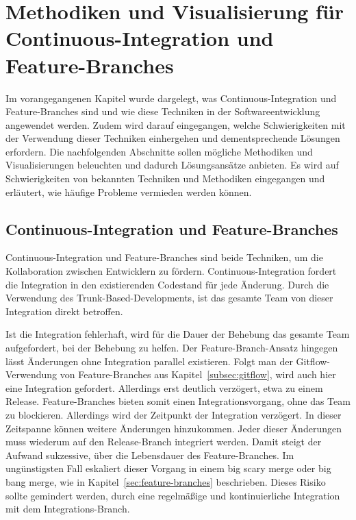 \chapter[Methodiken und Visualisierung]{Methodiken und Visualisierung für Continuous-Integration und Feature-Branches}
\label{ch:visu_meth}

Im vorangegangenen Kapitel wurde dargelegt, was Continuous-Integration und Feature-Branches sind und wie diese Techniken in der Softwareentwicklung angewendet werden. Zudem wird darauf eingegangen, welche Schwierigkeiten mit der Verwendung dieser Techniken einhergehen und dementsprechende Lösungen erfordern. 
Die nachfolgenden Abschnitte sollen mögliche Methodiken und Visualisierungen beleuchten und dadurch Lösungsansätze anbieten. Es wird auf Schwierigkeiten von bekannten Techniken und Methodiken eingegangen und erläutert, wie häufige Probleme vermieden werden können.

\section{Continuous-Integration und Feature-Branches}

Continuous-Integration und Feature-Branches sind beide Techniken, um die Kollaboration zwischen Entwicklern zu fördern. Continuous-Integration fordert die Integration in den existierenden Codestand für jede Änderung. Durch die Verwendung des Trunk-Based-Developments, ist das gesamte Team von dieser Integration direkt betroffen. 

Ist die Integration fehlerhaft, wird für die Dauer der Behebung das gesamte Team aufgefordert, bei der Behebung zu helfen. Der Feature-Branch-Ansatz hingegen lässt Änderungen ohne Integration parallel existieren. Folgt man der Gitflow-Verwendung von Feature-Branches aus Kapitel~\ref{subsec:gitflow}, wird auch hier eine Integration gefordert. Allerdings erst deutlich verzögert, etwa zu einem Release. Feature-Branches bieten somit einen Integrationsvorgang, ohne das Team zu blockieren. Allerdings wird der Zeitpunkt der Integration verzögert. In dieser Zeitspanne können weitere Änderungen hinzukommen. Jeder dieser Änderungen muss wiederum auf den Release-Branch integriert werden. Damit steigt der Aufwand sukzessive, über die Lebensdauer des Feature-Branches. Im ungünstigsten Fall eskaliert dieser Vorgang in einem \glqq big scary merge\grqq{} oder \glqq big bang merge\grqq{}, wie in Kapitel~\ref{sec:feature-branches} beschrieben. Dieses Risiko sollte gemindert werden, durch eine regelmäßige und kontinuierliche Integration mit dem Integrations-Branch.\\

